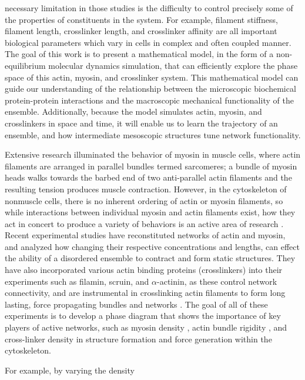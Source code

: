 \documentclass[12pt]{article} \usepackage{times} \usepackage{graphicx}
\begin{document}
necessary limitation in those studies is the difficulty to control precisely
some of the properties of constituents in the system. For example, filament
stiffness, filament length, crosslinker length, and crosslinker affinity are
all important biological parameters which vary in cells in complex and often
coupled manner. The goal of this work is to present a mathematical model, in
the form of a non-equilibrium molecular dynamics simulation, that can
efficiently explore the phase space of this actin, myosin, and crosslinker
system. This mathematical model can guide our understanding of the relationship
between the microscopic biochemical protein-protein interactions and the
macroscopic mechanical functionality of the ensemble. Additionally, because the
model simulates actin, myosin, and crosslinkers in space and time, it will
enable us to learn the trajectory of an ensemble, and how intermediate
mesoscopic structures tune network functionality.  \par Extensive research
illuminated the behavior of myosin in muscle cells, where actin filaments are
arranged in parallel bundles termed sarcomeres; a bundle of myosin heads walks
towards the barbed end of two anti-parallel actin filaments and the resulting
tension produces muscle contraction\cite{huxley1969}. However, in the
cytoskeleton of nonmuscle cells, there is no inherent ordering of actin or
myosin filaments, so while interactions between individual myosin and actin
filaments exist, how they act in concert to produce a variety of behaviors is
an active area of research \cite{murrell2012, stam2015, murrell2015}.  Recent
experimental studies \cite{murrell2012, murrell2014} have reconstituted
networks of actin and myosin, and analyzed how changing their respective
concentrations and lengths, can effect the ability of a disordered ensemble to
contract and form static structures. They have also incorporated various actin
binding proteins (crosslinkers) into their experiments such as filamin, scruin,
and $\alpha$-actinin, as these control network connectivity, and are
instrumental in crosslinking actin filaments to form long lasting, force
propagating bundles and networks \cite{gardel2004, murrell2012, murrell2014,
murrell2015}. The goal of all of these experiments is to develop a phase
diagram that shows the importance of key players of active networks, such as
myosin density \cite{murrell2012}, actin bundle rigidity \cite{murrell2012},
and cross-linker density\cite{murrell2014} in structure formation and force
generation within the cytoskeleton.  \par For example, by varying the density
\end{document}
